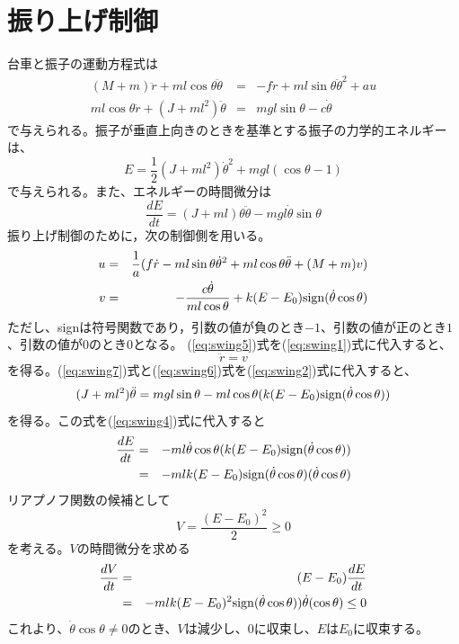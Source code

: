 \documentclass[a4j,11pt,twoside]{ujbook}
\begin{document}
	\section{振り上げ制御}	
		台車と振子の運動方程式は
		\begin{eqnarray}
			(M + m)\ddot{r} + ml\cos\theta\ddot{\theta} &=& -f\dot{r} + ml\sin\theta\ddot{\theta}^{2} + au \label{eq:swing1}\\
			ml\cos\theta\ddot{r} + (J + ml^2)\ddot{\theta} &=& mgl\sin\theta - c\dot{\theta} \label{eq:swing2}
		\end{eqnarray}
		で与えられる。振子が垂直上向きのときを基準とする振子の力学的エネルギーは、
		\begin{equation}
			E = \frac{1}{2}(J + ml^2){\dot{\theta}}^2 + mgl(\cos\theta - 1)
		\end{equation}
		で与えられる。また、エネルギーの時間微分は
		\begin{equation}
			\frac{dE}{dt} = (J + ml)\theta\ddot{\theta} - mgl\dot{\theta}\sin\theta \label{eq:swing4}
		\end{equation}
		振り上げ制御のために，次の制御側を用いる。
		\begin{eqnarray}
			u &=& \frac{1}{a}(f\dot{r} - ml\sin\theta\dot{\theta}^{2} + ml\cos\theta\ddot{\theta} + (M + m)v) \label{eq:swing5}\\
			v &=& -\frac{c\dot{\theta}}{ml\cos\theta} + k(E-E_{0}){\rm sign}(\dot\theta\cos\theta) \label{eq:swing6}
		\end{eqnarray}
		ただし、signは符号関数であり，引数の値が負のとき$-1$、引数の値が正のとき$1$、引数の値が$0$のとき$0$となる。
		(\ref{eq:swing5})式を(\ref{eq:swing1})式に代入すると、
		\begin{equation}
			\ddot{r} = v \label{eq:swing7}
		\end{equation}
		を得る。(\ref{eq:swing7})式と(\ref{eq:swing6})式を(\ref{eq:swing2})式に代入すると、
		\begin{equation}
			(J + ml^2)\ddot{\theta} = mgl\sin\theta - ml\cos\theta(k(E-E_{0}){\rm sign}(\dot{\theta}\cos\theta))
		\end{equation}
		を得る。この式を(\ref{eq:swing4})式に代入すると
		\begin{eqnarray*}
			\frac{dE}{dt} 
			&=&-ml\dot\theta\cos\theta(k(E-E_{0})\rm{sign}(\dot{\theta}\cos\theta))\\
			&=&-mlk(E-E_{0})\rm{sign}(\dot{\theta}\cos\theta)(\dot{\theta}\cos\theta)
		\end{eqnarray*}
		リアプノフ関数の候補として
		\begin{equation}
			V = \frac{(E - E_{0})^{2}}{2} \geq 0
		\end{equation}
		を考える。$V$の時間微分を求める
		\begin{eqnarray*}
			\frac{dV}{dt} &=& (E - E_{0})\frac{dE}{dt}\\
			&=&  -mlk(E-E_{0})^{2}{\rm sign}(\dot{\theta}\cos\theta))\dot{\theta}(\cos\theta)  \le 0
		\end{eqnarray*}
		これより、$\dot{\theta}\cos\theta\neq0$のとき、$V$は減少し、$0$に収束し、$E$は$E_{0}$に収束する。
		
\end{document}
